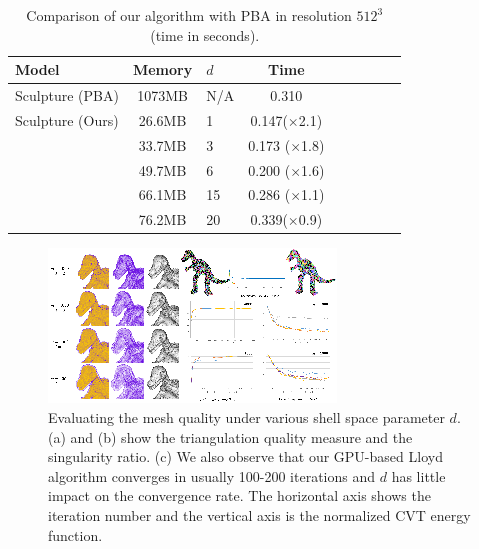 \begin{table}[tbh]
\caption{Comparison of our algorithm with PBA in resolution $512^3$ (time in seconds).}
\begin{center}
\begin{tabular}{lclclclcl}
\hline
    Model & Memory & $d$ & Time \\
 \hline
 Sculpture (PBA) & 1073MB    & N/A    &   0.310   \\
 Sculpture (Ours)  & 26.6MB    & 1    &   0.147($\times$2.1)  \\
             & 33.7MB    & 3    &   0.173 ($\times$1.8) \\
             & 49.7MB    & 6    &  0.200 ($\times$1.6) \\
             & 66.1MB    & 15    &  0.286 ($\times$1.1) \\
             & 76.2MB    & 20      & 0.339($\times$0.9) \\

  \hline
\end{tabular}
\end{center}
\label{tab:PBAtable}
\end{table}


\begin{figure}[tbh]
\centerline{\includegraphics[width=\linewidth]{figs/gcvt/bandComparison-horizontal2}}
\vspace{-0.15in}
\caption{Evaluating the mesh quality under various shell space parameter $d$.
(a) and (b) show the triangulation quality measure and the singularity ratio.
(c) We also observe that our GPU-based Lloyd algorithm converges in usually 100-200 iterations
and $d$ has little impact on the convergence rate.
The horizontal axis shows the iteration number and the vertical axis is the normalized CVT energy function.
}
  \label{fig:Shell space comparison}
\end{figure}

